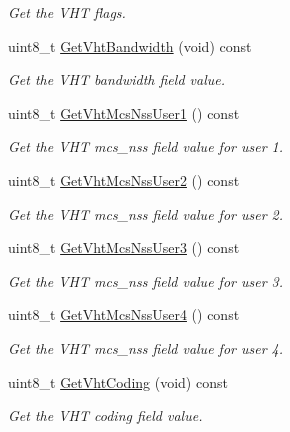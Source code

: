 \begin{DoxyCompactItemize}
\begin{DoxyCompactList}\small\item\em Get the V\+HT flags. \end{DoxyCompactList}\item 
uint8\+\_\+t \hyperlink{classns3_1_1RadiotapHeader_a7abc5cb9ba3c93718090e96eb3df2611}{Get\+Vht\+Bandwidth} (void) const 
\begin{DoxyCompactList}\small\item\em Get the V\+HT bandwidth field value. \end{DoxyCompactList}\item 
uint8\+\_\+t \hyperlink{classns3_1_1RadiotapHeader_a0f1eedc9719d3a949bd404812c820a21}{Get\+Vht\+Mcs\+Nss\+User1} () const 
\begin{DoxyCompactList}\small\item\em Get the V\+HT mcs\+\_\+nss field value for user 1. \end{DoxyCompactList}\item 
uint8\+\_\+t \hyperlink{classns3_1_1RadiotapHeader_a53722d6e86fa66f2490af4f10c994d5e}{Get\+Vht\+Mcs\+Nss\+User2} () const 
\begin{DoxyCompactList}\small\item\em Get the V\+HT mcs\+\_\+nss field value for user 2. \end{DoxyCompactList}\item 
uint8\+\_\+t \hyperlink{classns3_1_1RadiotapHeader_a64dc058c496df7ed32add0e71015c452}{Get\+Vht\+Mcs\+Nss\+User3} () const 
\begin{DoxyCompactList}\small\item\em Get the V\+HT mcs\+\_\+nss field value for user 3. \end{DoxyCompactList}\item 
uint8\+\_\+t \hyperlink{classns3_1_1RadiotapHeader_aae9444cf56e36296a4a64f24f2effc7a}{Get\+Vht\+Mcs\+Nss\+User4} () const 
\begin{DoxyCompactList}\small\item\em Get the V\+HT mcs\+\_\+nss field value for user 4. \end{DoxyCompactList}\item 
uint8\+\_\+t \hyperlink{classns3_1_1RadiotapHeader_a3f3bf62265596d602284bb5116d0d4f2}{Get\+Vht\+Coding} (void) const 
\begin{DoxyCompactList}\small\item\em Get the V\+HT coding field value. \end{DoxyCompactList}\item 

\end{DoxyCompactItemize}
